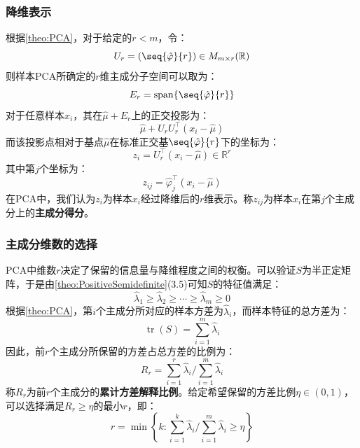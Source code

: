 \subsubsection{降维表示}
根据\cref{theo:PCA}，对于给定的$r<m$，令：
\begin{equation*}
	U_r=(\seq{\hat{\varphi}}{r})\in M_{m\times r}(\mathbb{R})
\end{equation*}
则样本PCA所确定的$r$维主成分子空间可以取为：
\begin{equation*}
	E_r=\operatorname{span}\{\seq{\hat{\varphi}}{r}\}
\end{equation*}
对于任意样本$x_i$，其在$\hat{\mu}+E_r$上的正交投影为：
\begin{equation*}
	\hat{\mu}+U_rU_r^{\top}(x_i-\hat{\mu})
\end{equation*}
而该投影点相对于基点$\hat{\mu}$在标准正交基$\seq{\hat{\varphi}}{r}$下的坐标为：
\begin{equation*}
	z_i=U_r^{\top}(x_i-\hat{\mu})\in\mathbb{R}^r
\end{equation*}
其中第$j$个坐标为：
\begin{equation*}
	z_{ij}=\hat{\varphi}_j^{\top}(x_i-\hat{\mu})
\end{equation*}
在PCA中，我们认为$z_i$为样本$x_i$经过降维后的$r$维表示。称$z_{ij}$为样本$x_i$在第$j$个主成分上的\textbf{主成分得分}。
\subsubsection{主成分维数的选择}
PCA中维数$r$决定了保留的信息量与降维程度之间的权衡。可以验证$S$为半正定矩阵，于是由\cref{theo:PositiveSemidefinite}(3.5)可知$S$的特征值满足：
\begin{equation*}
	\hat{\lambda}_1\geqslant\hat{\lambda}_2\geqslant\cdots\geqslant\hat{\lambda}_m\geqslant0
\end{equation*}
根据\cref{theo:PCA}，第$i$个主成分所对应的样本方差为$\hat{\lambda}_i$，而样本特征的总方差为：
\begin{equation*}
	\operatorname{tr}(S)=\sum_{i=1}^{m}\hat{\lambda}_i
\end{equation*}
因此，前$r$个主成分所保留的方差占总方差的比例为：
\begin{equation*}
	R_r=\sum_{i=1}^{r}\hat{\lambda}_i\Big/\sum_{i=1}^{m}\hat{\lambda}_i
\end{equation*}
称$R_r$为前$r$个主成分的\textbf{累计方差解释比例}。给定希望保留的方差比例$\eta\in(0,1)$，可以选择满足$R_r\geqslant\eta$的最小$r$，即：
\begin{equation*}
	r=\min\left\{k:\sum_{i=1}^{k}\hat{\lambda}_i\Big/\sum_{i=1}^{m}\hat{\lambda}_i\geqslant\eta\right\}
\end{equation*}

